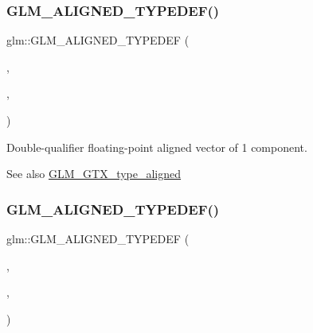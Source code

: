 \subsubsection{\texorpdfstring{G\+L\+M\+\_\+\+A\+L\+I\+G\+N\+E\+D\+\_\+\+T\+Y\+P\+E\+D\+E\+F()}{GLM\_ALIGNED\_TYPEDEF()}\hspace{0.1cm}{\footnotesize\ttfamily [159/209]}}
{\footnotesize\ttfamily glm\+::\+G\+L\+M\+\_\+\+A\+L\+I\+G\+N\+E\+D\+\_\+\+T\+Y\+P\+E\+D\+EF (\begin{DoxyParamCaption}\item[{\mbox{\hyperlink{group__gtc__type__precision_ga6478d0530433bb907956a46b2cd99161}{f64vec1}}}]{,  }\item[{aligned\+\_\+f64vec1}]{,  }\item[{8}]{ }\end{DoxyParamCaption})}

Double-\/qualifier floating-\/point aligned vector of 1 component. \begin{DoxySeeAlso}{See also}
\mbox{\hyperlink{group__gtx__type__aligned}{G\+L\+M\+\_\+\+G\+T\+X\+\_\+type\+\_\+aligned}} 
\end{DoxySeeAlso}
\mbox{\label{group__gtx__type__aligned_ga32814aa0f19316b43134fc25f2aad2b9}} 
\subsubsection{\texorpdfstring{G\+L\+M\+\_\+\+A\+L\+I\+G\+N\+E\+D\+\_\+\+T\+Y\+P\+E\+D\+E\+F()}{GLM\_ALIGNED\_TYPEDEF()}\hspace{0.1cm}{\footnotesize\ttfamily [160/209]}}
{\footnotesize\ttfamily glm\+::\+G\+L\+M\+\_\+\+A\+L\+I\+G\+N\+E\+D\+\_\+\+T\+Y\+P\+E\+D\+EF (\begin{DoxyParamCaption}\item[{\mbox{\hyperlink{group__gtc__type__precision_ga6c794781267fd5c810d9a6e7086e02a6}{f64vec2}}}]{,  }\item[{aligned\+\_\+f64vec2}]{,  }\item[{16}]{ }\end{DoxyParamCaption})}


